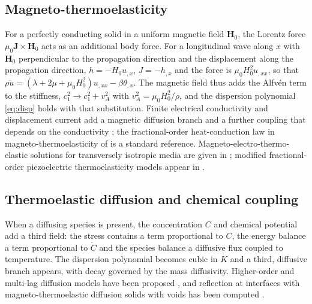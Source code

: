 \subsection{Magneto-thermoelasticity}
For a perfectly conducting solid in a uniform magnetic field $\bm H_0$, the Lorentz force $\mu_0\bm J\times\bm H_0$ acts as an additional body force. For a longitudinal wave along $x$ with $\bm H_0$ perpendicular to the propagation direction and the displacement along the propagation direction, $h=-H_0u_{,x}$, $J=-h_{,x}$ and the force is $\mu_0H_0^2u_{,xx}$, so that $\rho\ddot u=(\lambda+2\mu+\mu_0H_0^2)u_{,xx}-\beta\theta_{,x}$. The magnetic field thus adds the Alfv\'en term to the stiffness, $c_1^2\to c_1^2+v_A^2$ with $v_A^2=\mu_0H_0^2/\rho$, and the dispersion polynomial \eqref{eq:disp} holds with that substitution. Finite electrical conductivity and displacement current add a magnetic diffusion branch and a further coupling that depends on the conductivity \citep{Ezzat2011,Ezzat2004,Ezzat2010,Bayones2021,Biswas2019,KumarKansal2017}; the fractional-order heat-conduction law in magneto-thermoelasticity of \citep{Ezzat2011} is a standard reference. Magneto-electro-thermo-elastic solutions for transversely isotropic media are given in \citep{Chen2004}; modified fractional-order piezoelectric thermoelasticity models appear in \citep{Guo2018,Mondal2020}.

\subsection{Thermoelastic diffusion and chemical coupling}
When a diffusing species is present, the concentration $C$ and chemical potential add a third field: the stress contains a term proportional to $C$, the energy balance a term proportional to $\dot C$ and the species balance a diffusive flux coupled to temperature. The dispersion polynomial becomes cubic in $K$ and a third, diffusive branch appears, with decay governed by the mass diffusivity. Higher-order and multi-lag diffusion models have been proposed \citep{Abouelregal2020a}, and reflection at interfaces with magneto-thermoelastic diffusion solids with voids has been computed \citep{KumarKansal2017}.

